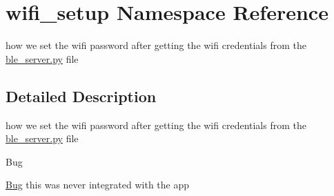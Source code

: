 \hypertarget{namespacewifi__setup}{}\section{wifi\+\_\+setup Namespace Reference}
\label{namespacewifi__setup}


how we set the wifi password after getting the wifi credentials from the \hyperlink{ble__server_8py}{ble\+\_\+server.\+py} file  




\subsection{Detailed Description}
how we set the wifi password after getting the wifi credentials from the \hyperlink{ble__server_8py}{ble\+\_\+server.\+py} file 

\begin{DoxyRefDesc}{Bug}
\item[\hyperlink{bug__bug000001}{Bug}]this was never integrated with the app \end{DoxyRefDesc}

